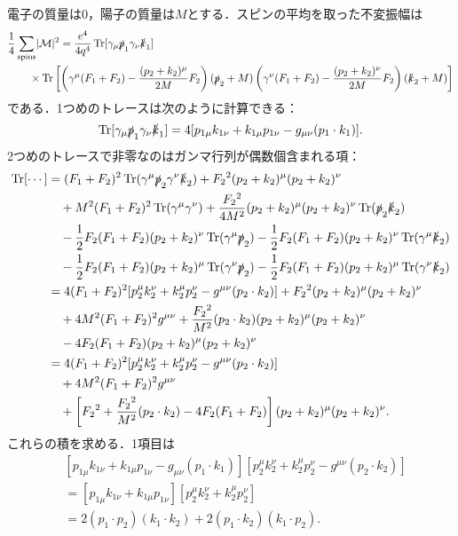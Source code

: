 電子の質量は$0$，陽子の質量は$M$とする．スピンの平均を取った不変振幅は
\begin{align*}
  & \frac{1}{4} \sum_\text{spins} \lvert\mathcal{M}\rvert^2 = \frac{e^4}{4q^4} \operatorname{Tr} [\gamma_\mu \slashed{p}_1 \gamma_\nu \slashed{k}_1] \\
  & \qquad \times \operatorname{Tr} \left[ \left( \gamma^\mu (F_1 + F_2) - \frac{(p_2 + k_2)^\mu}{2M} F_2 \right)
  (\slashed{p}_2 + M) \left( \gamma^\nu (F_1 + F_2) - \frac{(p_2 + k_2)^\nu}{2M} F_2 \right) (\slashed{k}_2 + M) \right]
\end{align*}
である．1つめのトレースは次のように計算できる：
\[ \operatorname{Tr} [\gamma_\mu \slashed{p}_1 \gamma_\nu \slashed{k}_1] = 4 [ p_{1\mu}k_{1\nu} + k_{1\mu}p_{1\nu} - g_{\mu\nu} (p_1 \cdot k_1) ] . \]
2つめのトレースで非零なのはガンマ行列が偶数個含まれる項：
\begin{align*}
  \operatorname{Tr}[\cdots] &= (F_1 + F_2)^2 \operatorname{Tr} (\gamma^\mu \slashed{p}_2 \gamma^\nu \slashed{k}_2) + F_2{}^2 (p_2 + k_2)^\mu (p_2 + k_2)^\nu \\
  & \quad + M^2 (F_1 + F_2)^2 \operatorname{Tr} (\gamma^\mu\gamma^\nu) + \frac{F_2{}^2}{4M^2} (p_2 + k_2)^\mu (p_2 + k_2)^\nu \operatorname{Tr}(\slashed{p}_2\slashed{k}_2) \\
  & \quad - \frac{1}{2} F_2 (F_1 + F_2) (p_2 + k_2)^\nu \operatorname{Tr} (\gamma^\mu\slashed{p}_2)
  - \frac{1}{2} F_2 (F_1 + F_2) (p_2 + k_2)^\nu \operatorname{Tr} (\gamma^\mu\slashed{k}_2) \\
  & \quad - \frac{1}{2} F_2 (F_1 + F_2) (p_2 + k_2)^\mu \operatorname{Tr} (\gamma^\nu\slashed{p}_2)
  - \frac{1}{2} F_2 (F_1 + F_2) (p_2 + k_2)^\mu \operatorname{Tr} (\gamma^\nu\slashed{k}_2) \\
  &= 4 (F_1 + F_2)^2 [ p_2^\mu k_2^\nu + k_2^\mu p_2^\nu - g^{\mu\nu} (p_2 \cdot k_2) ] + F_2{}^2 (p_2 + k_2)^\mu (p_2 + k_2)^\nu \\
  & \quad + 4 M^2 (F_1 + F_2)^2 g^{\mu\nu} + \frac{F_2{}^2}{M^2} (p_2 \cdot k_2) (p_2 + k_2)^\mu (p_2 + k_2)^\nu \\
  & \quad - 4 F_2 (F_1 + F_2) (p_2 + k_2)^\mu (p_2 + k_2)^\nu \\
  &= 4 (F_1 + F_2)^2 [ p_2^\mu k_2^\nu + k_2^\mu p_2^\nu - g^{\mu\nu} (p_2 \cdot k_2) ] \\
  & \quad + 4 M^2 (F_1 + F_2)^2 g^{\mu\nu} \\
  & \quad + \left[ F_2{}^2 + \frac{F_2{}^2}{M^2} (p_2 \cdot k_2) - 4 F_2 (F_1 + F_2) \right] (p_2 + k_2)^\mu (p_2 + k_2)^\nu .
\end{align*}
これらの積を求める．1項目は
\begin{align*}
  & [ p_{1\mu}k_{1\nu} + k_{1\mu}p_{1\nu} - g_{\mu\nu} (p_1 \cdot k_1) ][ p_2^\mu k_2^\nu + k_2^\mu p_2^\nu - g^{\mu\nu} (p_2 \cdot k_2) ] \\
  &= [ p_{1\mu}k_{1\nu} + k_{1\mu}p_{1\nu} ][ p_2^\mu k_2^\nu + k_2^\mu p_2^\nu ] \\
  &= 2(p_1 \cdot p_2)(k_1 \cdot k_2) + 2(p_1 \cdot k_2)(k_1 \cdot p_2) .
\end{align*}

